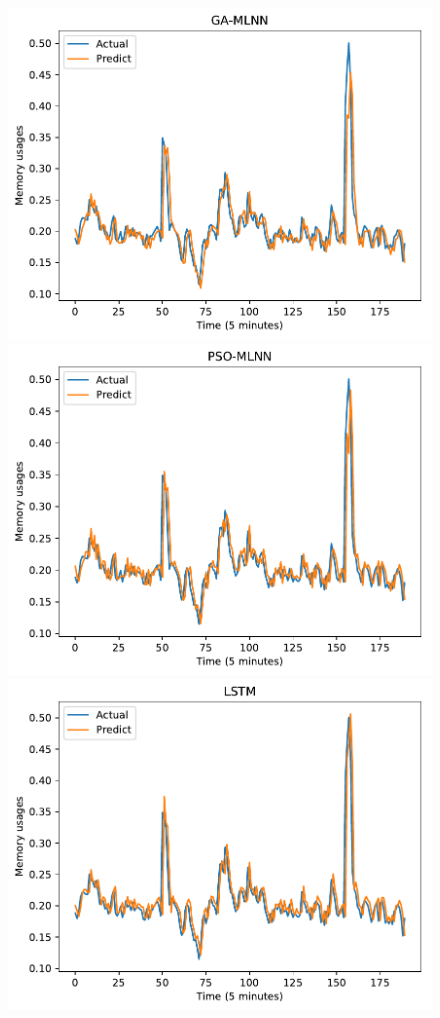 \documentclass[11pt,twoside]{article}
\begin{document}
\begin{multicols}{2}
\begin{figure}[!ht] 
  \begin{minipage}[b]{0.33\linewidth}
    \centering
    \includegraphics[width=0.9\linewidth]{predict/k5/ram_k5_ga_mlnn.pdf} 
  \end{minipage}
  \begin{minipage}[b]{0.33\linewidth}
    \centering
    \includegraphics[width=0.9\linewidth]{predict/k5/ram_k5_pso_mlnn.pdf} 
  \end{minipage} 
  \begin{minipage}[b]{0.33\linewidth}
    \centering
    \includegraphics[width=0.9\linewidth]{predict/k5/ram_k5_lstm.pdf} 

\end{minipage}
\end{figure}
\end{multicols}
\end{document}
